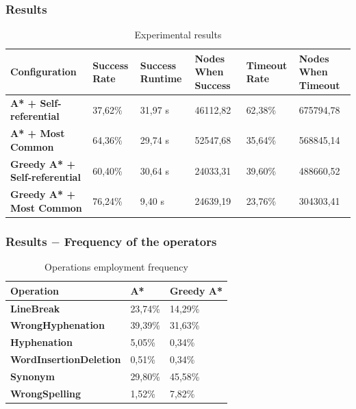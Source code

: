 \documentclass{beamer}
\begin{document}
\begin{frame}
\frametitle{Results}

\begin{small}
\begin{table}[h]
\centering
\begin{tabular}{p{2.4cm} | p{1.3cm} | p{1.3cm} | p{1.3cm} | p{1.3cm} | p{1.3cm}}
	\hline
	\textbf{Configuration} & \textbf{Success Rate} & \textbf{Success Runtime} & \textbf{Nodes When Success} & \textbf{Timeout Rate} & \textbf{Nodes When Timeout} \\ \hline
	\textbf{A* + Self-referential}	& 37,62\%	& 31,97 s	& 46112,82	& 62,38\%	& 675794,78 \\ \hline
	\textbf{A* + Most Common}		& 64,36\%	& 29,74 s	& 52547,68	& 35,64\%	& 568845,14 \\ \hline
	\textbf{Greedy A* + Self-referential}	& 60,40\%	& 30,64 s	& 24033,31	& 39,60\%	& 488660,52 \\ \hline
	\textbf{Greedy A* + Most Common}	& 76,24\%	& 9,40 s	& 24639,19	& 23,76\%	& 304303,41 \\ \hline
\end{tabular}
\label{tab:results}
\caption{Experimental results}
\end{table}
\end{small}

\end{frame}

\begin{frame}
\frametitle{Results $-$ Frequency of the operators}

\begin{small}
\begin{table}[h]
\centering
\begin{tabular}{l | l | l}
	\hline
	\textbf{Operation} &	\textbf{A*} &	\textbf{Greedy A*} \\ \hline
	\textbf{LineBreak} &	23,74\% &	14,29\% \\
	\textbf{WrongHyphenation} &	39,39\% &	31,63\% \\
	\textbf{Hyphenation} &	5,05\% &	0,34\% \\
	\textbf{WordInsertionDeletion} &	0,51\% &	0,34\% \\
	\textbf{Synonym} &	29,80\% &	45,58\% \\
	\textbf{WrongSpelling} &	1,52\% &	7,82\% \\
	\hline
\end{tabular}
\label{tab:operations_freq}
\caption{Operations employment frequency}
\end{table}
\end{small}

\end{frame}
\end{document}
